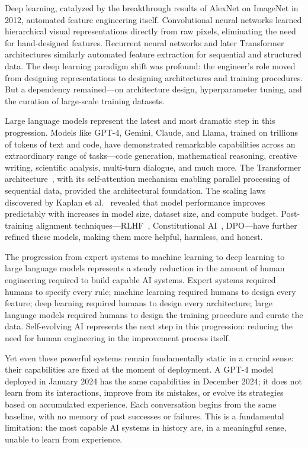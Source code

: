 Deep learning, catalyzed by the breakthrough results of AlexNet on ImageNet in 2012, automated feature engineering itself. Convolutional neural networks learned hierarchical visual representations directly from raw pixels, eliminating the need for hand-designed features. Recurrent neural networks and later Transformer architectures similarly automated feature extraction for sequential and structured data. The deep learning paradigm shift was profound: the engineer's role moved from designing representations to designing architectures and training procedures. But a dependency remained---on architecture design, hyperparameter tuning, and the curation of large-scale training datasets.

Large language models represent the latest and most dramatic step in this progression. Models like GPT-4, Gemini, Claude, and Llama, trained on trillions of tokens of text and code, have demonstrated remarkable capabilities across an extraordinary range of tasks---code generation, mathematical reasoning, creative writing, scientific analysis, multi-turn dialogue, and much more. The Transformer architecture~\citep{vaswani2017attention}, with its self-attention mechanism enabling parallel processing of sequential data, provided the architectural foundation. The scaling laws discovered by Kaplan et al.~\citep{kaplan2020scaling} revealed that model performance improves predictably with increases in model size, dataset size, and compute budget. Post-training alignment techniques---RLHF~\citep{ouyang2022rlhf}, Constitutional AI~\citep{bai2022constitutional}, DPO---have further refined these models, making them more helpful, harmless, and honest.

The progression from expert systems to machine learning to deep learning to large language models represents a steady reduction in the amount of human engineering required to build capable AI systems. Expert systems required humans to specify every rule; machine learning required humans to design every feature; deep learning required humans to design every architecture; large language models required humans to design the training procedure and curate the data. Self-evolving AI represents the next step in this progression: reducing the need for human engineering in the improvement process itself.

Yet even these powerful systems remain fundamentally static in a crucial sense: their capabilities are fixed at the moment of deployment. A GPT-4 model deployed in January 2024 has the same capabilities in December 2024; it does not learn from its interactions, improve from its mistakes, or evolve its strategies based on accumulated experience. Each conversation begins from the same baseline, with no memory of past successes or failures. This is a fundamental limitation: the most capable AI systems in history are, in a meaningful sense, unable to learn from experience.

